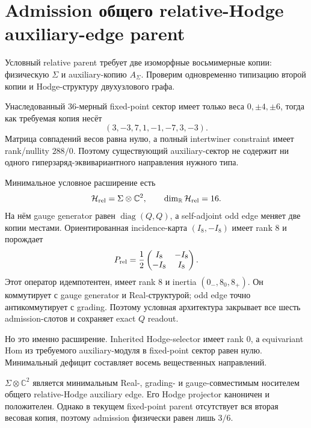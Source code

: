 \chapter{Admission общего relative-Hodge auxiliary-edge parent}
\label{ch:v10-h15-r2-relative-hodge-auxiliary-edge-admission}

Условный relative parent требует две изоморфные восьмимерные копии:
физическую $\Sigma$ и auxiliary-копию $A_\Sigma$. Проверим одновременно
типизацию второй копии и Hodge-структуру двухузлового графа.

Унаследованный 36-мерный fixed-point сектор имеет только веса
$0,\pm4,\pm6$, тогда как требуемая копия несёт
\begin{equation}
 (3,-3,7,1,-1,-7,3,-3).
\end{equation}
Матрица совпадений весов равна нулю, а полный intertwiner constraint имеет
rank/nullity $288/0$. Поэтому существующий auxiliary-сектор не содержит ни
одного гиперзаряд-эквивариантного направления нужного типа.

Минимальное условное расширение есть
\begin{equation}
 \mathcal H_{\rm rel}=\Sigma\otimes\mathbb C^2,
 \qquad \dim_{\mathbb R}\mathcal H_{\rm rel}=16.
\end{equation}
На нём gauge generator равен $\operatorname{diag}(Q,Q)$, а self-adjoint
odd edge меняет две копии местами. Ориентированная incidence-карта
$(I_8,-I_8)$ имеет rank $8$ и порождает
\begin{equation}
 P_{\rm rel}=\frac12
 \begin{pmatrix}I_8&-I_8\\-I_8&I_8\end{pmatrix}.
\end{equation}
Этот оператор идемпотентен, имеет rank $8$ и inertia
$(0_-,8_0,8_+)$. Он коммутирует с gauge generator и Real-структурой;
odd edge точно антикоммутирует с grading. Поэтому условная архитектура
закрывает все шесть admission-слотов и сохраняет exact $Q$ readout.

Но это именно расширение. Inherited Hodge-selector имеет rank $0$, а
equivariant Hom из требуемого auxiliary-модуля в fixed-point сектор равен
нулю. Минимальный дефицит составляет восемь вещественных направлений.

\begin{theorem}
$\Sigma\otimes\mathbb C^2$ является минимальным Real-, grading- и
gauge-совместимым носителем общего relative-Hodge auxiliary edge. Его
Hodge projector каноничен и положителен. Однако в текущем fixed-point
parent отсутствует вся вторая весовая копия, поэтому admission физически
равен лишь $3/6$.
\end{theorem}

